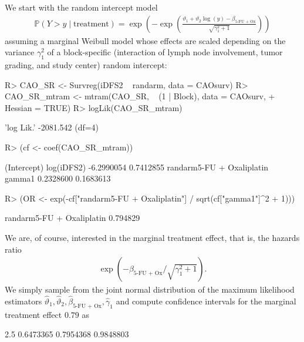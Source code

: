\documentclass[article,nojss,shortnames]{jss}\usepackage[]{graphicx}\usepackage[]{xcolor}
\newcommand{\rY}{Y}
\newcommand{\ry}{y}
\newcommand{\eparm}{\vartheta}
\newcommand{\eshiftparm}{\beta}
\renewcommand{\Prob}{\mathbb{P}}
\begin{document}
We start with the random intercept model
\begin{eqnarray*}
\Prob(\rY > \ry \mid \text{treatment}) = 
\exp\left(-\exp\left(\frac{\eparm_1 + \eparm_2 \log(\ry) - 
                     \eshiftparm_\text{5-FU + Ox}}{\sqrt{\gamma_1^2 + 1}}\right)\right)
\end{eqnarray*}
assuming a marginal Weibull model whose effects are scaled depending on the
variance $\gamma_1^2$ of a block-specific (interaction of lymph node involvement,
tumor grading, and study center) random intercept:
\begin{Schunk}
\begin{Sinput}
R> CAO_SR <- Survreg(iDFS2 ~ randarm, data = CAOsurv)
R> CAO_SR_mtram <- mtram(CAO_SR, ~ (1 | Block), data = CAOsurv,
+                        Hessian = TRUE)
R> logLik(CAO_SR_mtram)
\end{Sinput}
\begin{Soutput}
'log Lik.' -2081.542 (df=4)
\end{Soutput}
\begin{Sinput}
R> (cf <- coef(CAO_SR_mtram))
\end{Sinput}
\begin{Soutput}
              (Intercept)                log(iDFS2) 
               -6.2990054                 0.7412855 
randarm5-FU + Oxaliplatin                    gamma1 
                0.2328600                 0.1683613 
\end{Soutput}
\begin{Sinput}
R> (OR <- exp(-cf["randarm5-FU + Oxaliplatin"] / sqrt(cf["gamma1"]^2 + 1)))
\end{Sinput}
\begin{Soutput}
randarm5-FU + Oxaliplatin 
                 0.794829 
\end{Soutput}
\end{Schunk}
We are, of course, interested in the marginal treatment effect, that is, the
hazards ratio 
%
\begin{eqnarray*}
\exp\left(-\eshiftparm_\text{5-FU + Ox} / \sqrt{\gamma_1^2 + 1}\right).
\end{eqnarray*}
%
We simply sample from the joint normal distribution of the maximum likelihood estimators
$\hat{\eparm}_1, \hat{\eparm}_2, \hat{\eshiftparm}_\text{5-FU + Ox},
\hat{\gamma}_1$ and compute confidence intervals for the marginal treatment
effect $0.79$ as
\begin{Schunk}
\begin{Soutput}
     2.5%       50%     97.5% 
0.6473365 0.7954368 0.9848803 
\end{Soutput}
\end{Schunk}
\end{document}
